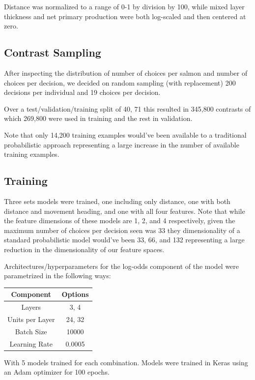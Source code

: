 \documentclass[11pt]{article}
\begin{document}
Distance was normalized to a range of 0-1 by division by 100, while mixed layer thickness and net primary production were both log-scaled and then centered at zero. 

\subsection*{Contrast Sampling}

After inspecting the distribution of number of choices per salmon and number of choices per decision, we decided on random sampling (with replacement) 200 decisions per individual and 19 choices per decision. 

Over a test/validation/training split of 40, 71 this resulted in 345,800 contrasts of which 269,800 were used in training and the rest in validation. 

Note that only 14,200 training examples would've been available to a traditional probabilistic approach representing a large increase in the number of available training examples.   

\subsection*{Training}

Three sets models were trained, one including only distance, one with both distance and movement heading, and one with all four features. Note that while the feature dimensions of these models are 1, 2, and 4 respectively, given the maximum number of choices per decision seen was 33 they dimensionality of a standard probabilistic model would've been 33, 66, and 132 representing a large reduction in the dimensionality of our feature spaces. 

Architectures/hyperparameters for the log-odds component of the model were parametrized in the following ways:

\begin{center}
\begin{tabular}{| c | c |} 
\hline 
Component & Options \\
\hline
Layers & 3, 4 \\ 
Units per Layer & 24, 32 \\
Batch Size & 10000 \\
Learning Rate & 0.0005 \\
\hline
\end{tabular}
\end{center}

With 5 models trained for each combination. Models were trained in Keras using an Adam optimizer for 100 epochs. 
\end{document}
